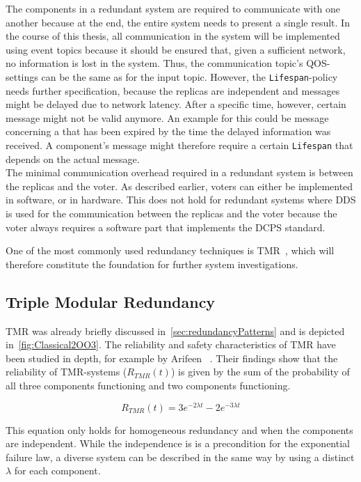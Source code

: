 The components in a redundant system are required to communicate with one another because at the end, the entire system needs to present a single result.
In the course of this thesis, all communication in the system will be implemented using  event topics because it should be ensured that, given a sufficient network, no information is lost in the system.
Thus, the communication topic's \gls*{QOS}-settings can be the same as for the input topic.
However, the \texttt{Lifespan}-policy needs further specification, because the replicas are independent and messages might be delayed due to network latency.
After a specific time, however, certain message might not be valid anymore.
An example for this could be message concerning a  that has been expired by the time the delayed information was received.
A component's message might therefore require a certain \texttt{Lifespan} that depends on the actual message.
\\

The minimal communication overhead required in a redundant system is between the replicas and the voter.
As described earlier, voters can either be implemented in software, or in hardware.
This does not hold for redundant systems where \gls*{DDS} is used for the communication between the replicas and the voter because the voter always requires a software part that implements the \gls*{DCPS} standard.

One of the most commonly used redundancy techniques is \gls*{TMR}~\cite{FaultToleranceViaNMR}, which will therefore constitute the foundation for further system investigations.

\subsection{Triple Modular Redundancy}
\Gls*{TMR} was already briefly discussed in~\autoref{sec:redundancyPatterns} and is depicted in~\autoref{fig:Classical2OO3}.
The reliability and safety characteristics of \gls*{TMR} have been studied in depth, for example by Arifeen \etal~\cite{ArifeenFaultTolerantTMR}.
Their findings show that the reliability of \gls*{TMR}-systems ($R_{TMR}(t)$) is given by the sum of the probability of all three components functioning and two components functioning.

\begin{equation}
R_{TMR}(t) = 3e^{-2 \lambda t} - 2e^{-3 \lambda t}
\end{equation}

This equation only holds for homogeneous redundancy and when the components are independent.
While the independence is is a precondition for the exponential failure law, a diverse system can be described in the same way by using a distinct $\lambda$ for each component.
\\

